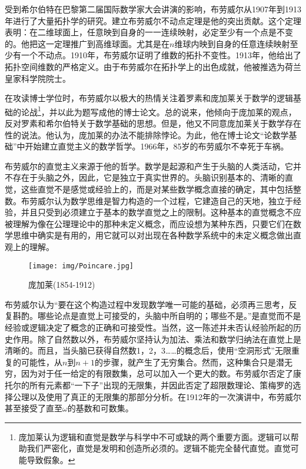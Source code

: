 \documentclass[b5paper]{ctexart}
\begin{document}
受到希尔伯特在巴黎第二届国际数学家大会讲演的影响，布劳威尔从1907年到1913年进行了大量拓扑学的研究。建立布劳威尔不动点定理是他的突出贡献。这个定理表明：在二维球面上，任意映到自身的一一连续映射，必定至少有一个点是不变的。他把这一定理推广到高维球面。尤其是在$n$维球内映到自身的任意连续映射至少有一个不动点。1910年，布劳威尔证明了维数的拓扑不变性。1913年，他给出了拓扑空间维数的严格定义。由于布劳威尔在拓扑学上的出色成就，他被推选为荷兰皇家科学院院士。

在攻读博士学位时，布劳威尔以极大的热情关注着罗素和庞加莱关于数学的逻辑基础的论战\footnote{庞加莱认为逻辑和直觉是数学与科学中不可或缺的两个重要方面。逻辑可以帮助我们严密化，直觉是发明和创造所必须的。逻辑不能完全替代直觉。直觉可能导致假象\cite{Poincare2}。}，并以此为题写成他的博士论文。总的说来，他倾向于庞加莱的观点，反对罗素和希尔伯特关于数学基础的思想。但是，他又不同意庞加莱关于数学存在性的说法。他认为，庞加莱的办法不能排除悖论。为此，他在博士论文“论数学基础”中开始建立直觉主义的数学哲学。1966年，85岁的布劳威尔不幸死于车祸。

布劳威尔的直觉主义来源于他的哲学。数学是起源和产生于头脑的人类活动，它并不存在于头脑之外，因此，它是独立于真实世界的。头脑识别基本的、清晰的直觉，这些直觉不是感觉或经验上的，而是对某些数学概念直接的确定，其中包括整数。布劳威尔认为数学思维是智力构造的一个过程，它建造自己的天地，独立于经验，并且只受到必须建立于基本的数学直觉之上的限制。这种基本的直觉概念不应被理解为像在公理理论中的那种未定义概念，而应设想为某种东西，只要它们在数学思维中确实是有用的，用它就可以对出现在各种数学系统中的未定义概念做出直观上的理解。

\begin{wrapfigure}{R}{0.3\textwidth}
 \centering
 \texttt{[image: img/Poincare.jpg]}
 \caption{庞加莱(1854-1912)}
 \label{fig:Poincare}
\end{wrapfigure}

布劳威尔认为“要在这个构造过程中发现数学唯一可能的基础，必须再三思考，反复斟酌。哪些论点是直觉上可接受的，头脑中所自明的；哪些不是。”是直觉而不是经验或逻辑决定了概念的正确和可接受性。当然，这一陈述并未否认经验所起的历史作用。除了自然数以外，布劳威尔坚持认为加法、乘法和数学归纳法在直觉上是清晰的。而且，当头脑已获得自然数1，2，3……的概念后，使用“空洞形式”无限重复的可能性，从$n$到$n+1$的步骤，就产生了无穷集合。然而，这种集合只是潜无穷，因为对于任一给定的有限数集，总可以加入一个更大的数。布劳威尔否定了康托尔的所有元素都“一下子”出现的无限集，并因此否定了超限数理论、策梅罗的选择公理以及使用了真正的无限集的那部分分析。在1912年的一次演讲中，布劳威尔甚至接受了直至$\omega$的基数和可数集。
\end{document}
